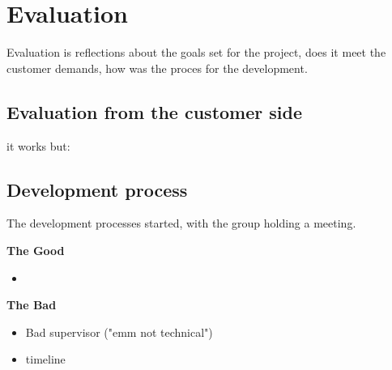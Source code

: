 \section{Evaluation}
Evaluation is reflections about the goals set for the project, does it meet
the customer demands, how was the proces for the development.

\subsection{Evaluation from the customer side}

it works but:


\subsection{Development process}
The development processes started, with the group holding a meeting.





\textbf{The Good} 
\begin{itemize}
    \item 
\end{itemize}

\textbf{The Bad} 
\begin{itemize}
    \item Bad supervisor ("emm not technical")
    \item timeline
\end{itemize}
